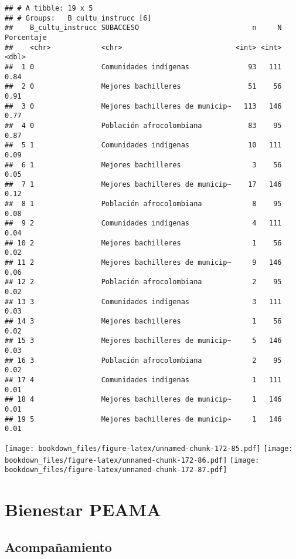 \documentclass[]{article}
\theoremstyle{definition}
\theoremstyle{definition}
\theoremstyle{definition}
\theoremstyle{remark}
\begin{document}
\begin{verbatim}
## # A tibble: 19 x 5
## # Groups:   B_cultu_instrucc [6]
##    B_cultu_instrucc SUBACCESO                           n     N Porcentaje
##    <chr>            <chr>                           <int> <int>      <dbl>
##  1 0                Comunidades indígenas              93   111       0.84
##  2 0                Mejores bachilleres                51    56       0.91
##  3 0                Mejores bachilleres de municip~   113   146       0.77
##  4 0                Población afrocolombiana           83    95       0.87
##  5 1                Comunidades indígenas              10   111       0.09
##  6 1                Mejores bachilleres                 3    56       0.05
##  7 1                Mejores bachilleres de municip~    17   146       0.12
##  8 1                Población afrocolombiana            8    95       0.08
##  9 2                Comunidades indígenas               4   111       0.04
## 10 2                Mejores bachilleres                 1    56       0.02
## 11 2                Mejores bachilleres de municip~     9   146       0.06
## 12 2                Población afrocolombiana            2    95       0.02
## 13 3                Comunidades indígenas               3   111       0.03
## 14 3                Mejores bachilleres                 1    56       0.02
## 15 3                Mejores bachilleres de municip~     5   146       0.03
## 16 3                Población afrocolombiana            2    95       0.02
## 17 4                Comunidades indígenas               1   111       0.01
## 18 4                Mejores bachilleres de municip~     1   146       0.01
## 19 5                Mejores bachilleres de municip~     1   146       0.01
\end{verbatim}

\texttt{[image: bookdown\_files/figure-latex/unnamed-chunk-172-85.pdf]}
\texttt{[image: bookdown\_files/figure-latex/unnamed-chunk-172-86.pdf]}
\texttt{[image: bookdown\_files/figure-latex/unnamed-chunk-172-87.pdf]}

\subsubsection{}\label{section}

\section{Bienestar PEAMA}\label{bienestar-peama}

\subsection{Acompañamiento}\label{acompanamiento-1}
\end{document}
